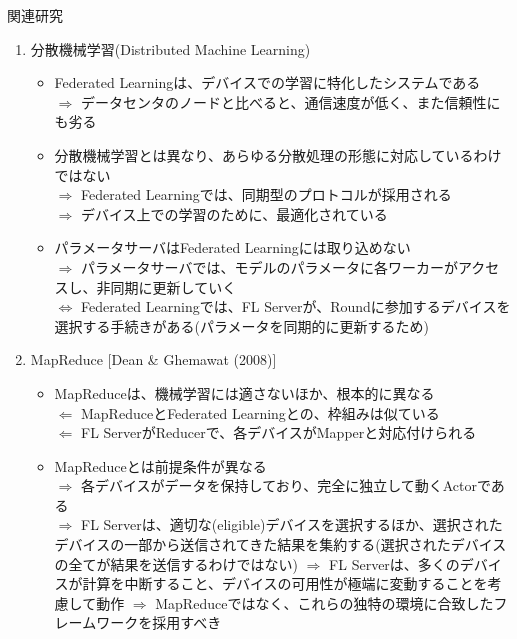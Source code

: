 \documentclass[dvipdfmx,notheorems,t]{beamer}
\begin{document}
\begin{frame}{関連研究}
\begin{enumerate}
	\framebreak
	
	\item 分散機械学習(Distributed Machine Learning)
	\begin{itemize}
		\item Federated Learningは、デバイスでの学習に特化したシステムである \\
		$\Rightarrow$ データセンタのノードと比べると、通信速度が低く、また信頼性にも劣る
		\newline
		
		\item 分散機械学習とは異なり、あらゆる分散処理の形態に対応しているわけではない \\
		$\Rightarrow$ Federated Learningでは、同期型のプロトコルが採用される \\
		$\Rightarrow$ デバイス上での学習のために、最適化されている
		\newline
		
		\item パラメータサーバはFederated Learningには取り込めない \\
		$\Rightarrow$ パラメータサーバでは、モデルのパラメータに各ワーカーがアクセスし、非同期に更新していく \\
		$\Leftrightarrow$ Federated Learningでは、FL Serverが、Roundに参加するデバイスを選択する手続きがある(パラメータを同期的に更新するため)
	\end{itemize}
	
	\framebreak
	
	\item MapReduce [Dean \& Ghemawat (2008)]
	\begin{itemize}
		\item MapReduceは、機械学習には適さないほか、根本的に異なる \\
		$\Leftarrow$ MapReduceとFederated Learningとの、枠組みは似ている \\
		$\Leftarrow$ FL ServerがReducerで、各デバイスがMapperと対応付けられる
		\newline
		
		\item MapReduceとは前提条件が異なる \\
		$\Rightarrow$ 各デバイスがデータを保持しており、完全に独立して動くActorである \\
		$\Rightarrow$ FL Serverは、適切な(eligible)デバイスを選択するほか、選択されたデバイスの一部から送信されてきた結果を集約する(選択されたデバイスの全てが結果を送信するわけではない) \newline \newline
		$\Rightarrow$ FL Serverは、多くのデバイスが計算を中断すること、デバイスの可用性が極端に変動することを考慮して動作 \newline \newline
		$\Rightarrow$ MapReduceではなく、これらの独特の環境に合致したフレームワークを採用すべき
	\end{itemize}
\end{enumerate}

\end{frame}
\end{document}

